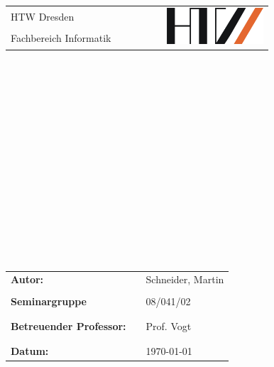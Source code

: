 \thispagestyle{empty}
\begin{center}
\begin{tabular}{lcr}
 \Large{HTW Dresden} & \verb|       |& \multirow{3}{*}{\includegraphics[height=1.353cm]{material/htwlogo.jpg}} \\
 \Large{Fachbereich Informatik} &  & \\
\end{tabular}\end{center}
\begin{center}


\end{center}
\begin{verbatim}





\end{verbatim}
\begin{center}
\textbf{\Huge{\ownTitle}}


\end{center}
\begin{verbatim}



\end{verbatim}
\begin{center}
\textbf{\LARGE{\ownTitleZ}}
\end{center}
\begin{verbatim}








\end{verbatim}
\begin{flushleft}
\begin{tabular}{lll}
\textbf{Autor:} & & Schneider, Martin\\
& & \\
\textbf{Seminargruppe} & & 08/041/02\\
& & \\
& & \\
\textbf{Betreuender Professor:} & & Prof. Vogt\\
& & \\
& & \\
\textbf{Datum:} & & \today\\

\end{tabular}

\end{flushleft}